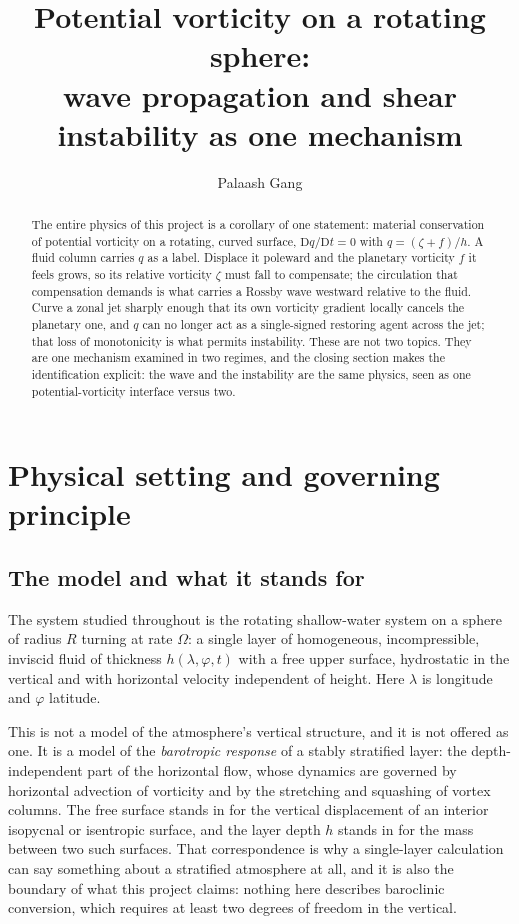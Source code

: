 \documentclass[11pt,a4paper]{article}
\title{Potential vorticity on a rotating sphere:\\
wave propagation and shear instability as one mechanism}
\author{Palaash Gang}
\date{}
\newcommand{\D}{\mathrm{D}}
\begin{document}
\maketitle

\begin{abstract}
\noindent
The entire physics of this project is a corollary of one statement: material
conservation of potential vorticity on a rotating, curved surface,
$\D q/\D t = 0$ with $q = (\zeta+f)/h$. A fluid column carries $q$ as a label.
Displace it poleward and the planetary vorticity $f$ it feels grows, so its
relative vorticity $\zeta$ must fall to compensate; the circulation that
compensation demands is what carries a Rossby wave westward relative to the
fluid. Curve a zonal jet sharply enough that its own vorticity gradient locally
cancels the planetary one, and $q$ can no longer act as a single-signed
restoring agent across the jet; that loss of monotonicity is what permits
instability. These are not two topics. They are one mechanism examined in two
regimes, and the closing section makes the identification explicit: the wave and
the instability are the same physics, seen as one potential-vorticity interface
versus two.
\end{abstract}

\tableofcontents

\section{Physical setting and governing principle}
\label{sec:setting}

\subsection{The model and what it stands for}

The system studied throughout is the rotating shallow-water system on a sphere
of radius $R$ turning at rate $\Omega$: a single layer of homogeneous,
incompressible, inviscid fluid of thickness $h(\lambda,\varphi,t)$ with a free
upper surface, hydrostatic in the vertical and with horizontal velocity
independent of height. Here $\lambda$ is longitude and $\varphi$ latitude.

This is not a model of the atmosphere's vertical structure, and it is not
offered as one. It is a model of the \emph{barotropic response} of a stably
stratified layer: the depth-independent part of the horizontal flow, whose
dynamics are governed by horizontal advection of vorticity and by the stretching
and squashing of vortex columns. The free surface stands in for the vertical
displacement of an interior isopycnal or isentropic surface, and the layer depth
$h$ stands in for the mass between two such surfaces. That correspondence is why
a single-layer calculation can say something about a stratified atmosphere at
all, and it is also the boundary of what this project claims: nothing here
describes baroclinic conversion, which requires at least two degrees of freedom
in the vertical.
\end{document}
